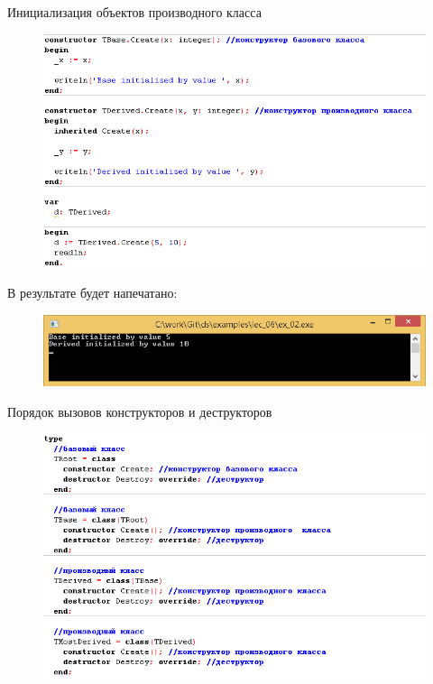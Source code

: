 \documentclass{beamer}
\begin{document}
\begin{frame}{Инициализация объектов производного класса}
\begin{figure}[h]
\centering
\includegraphics[scale=0.4]{images/lec06-pic26.png}
\end{figure}
В результате будет напечатано:
\begin{figure}[h]
\centering
\includegraphics[scale=0.4]{images/lec06-pic27.png}
\end{figure}
\end{frame}

\begin{frame}{Порядок вызовов конструкторов и деструкторов}
\begin{figure}[h]
\centering
\includegraphics[scale=0.5]{images/lec06-pic28.png}
\end{figure}
\end{frame}
\end{document}
